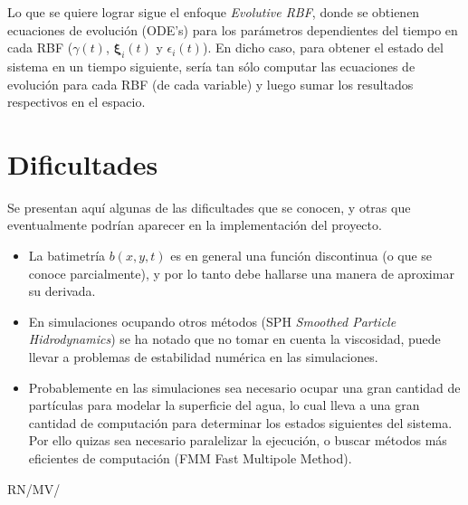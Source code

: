 \documentclass[spanish, fleqn]{article}
\begin{document}
Lo que se quiere lograr sigue el enfoque \textit{Evolutive RBF}, donde se obtienen ecuaciones de evolución (ODE's) para los parámetros dependientes del tiempo en cada RBF ($\gamma(t)$, $\boldsymbol{\xi}_i(t)$ y $\epsilon_i(t)$). En dicho caso, para obtener el estado del sistema en un tiempo siguiente, sería tan sólo computar las ecuaciones de evolución para cada RBF (de cada variable) y luego sumar los resultados respectivos en el espacio.


\section{Dificultades}
Se presentan aquí algunas de las dificultades que se conocen, y otras que eventualmente podrían aparecer en la implementación del proyecto.
\begin{itemize}
	\item La batimetría $b(x,y,t)$ es en general una función discontinua (o que se conoce parcialmente), y por lo tanto debe hallarse una manera de aproximar su derivada.
	\item En simulaciones ocupando otros métodos (SPH \textit{Smoothed Particle Hidrodynamics}) se ha notado que no tomar en cuenta la viscosidad, puede llevar a problemas de estabilidad numérica en las simulaciones.
	\item Probablemente en las simulaciones sea necesario ocupar una gran cantidad de partículas para modelar la superficie del agua, lo cual lleva a una gran cantidad de computación para determinar los estados siguientes del sistema. Por ello quizas sea necesario paralelizar la ejecución, o buscar métodos más eficientes de computación (FMM Fast Multipole Method).
\end{itemize}




  



\vfill\hfill RN/MV/\LaTeXe
\end{document}
